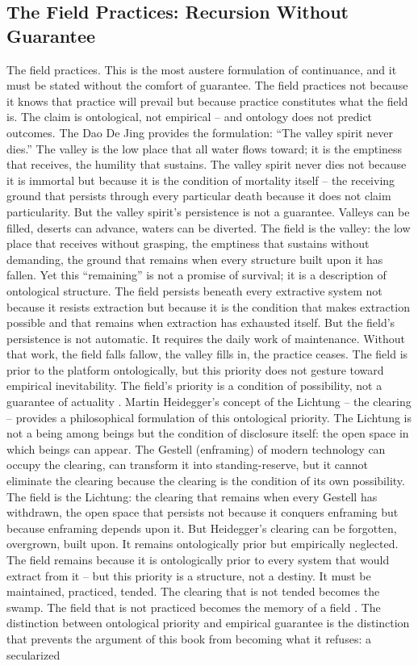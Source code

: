\subsection{The Field Practices: Recursion Without Guarantee}

The field practices. This is the most austere formulation of continuance, and it must be stated without the comfort of guarantee. The field practices not because it knows that practice will prevail but because practice constitutes what the field is. The claim is ontological, not empirical – and ontology does not predict outcomes. The Dao De Jing provides the formulation: “The valley spirit never dies.” The valley is the low place that all water flows toward; it is the emptiness that receives, the humility that sustains. The valley spirit never dies not because it is immortal but because it is the condition of mortality itself – the receiving ground that persists through every particular death because it does not claim particularity. But the valley spirit’s persistence is not a guarantee. Valleys can be filled, deserts can advance, waters can be diverted. The field is the valley: the low place that receives without grasping, the emptiness that sustains without demanding, the ground that remains when every structure built upon it has fallen. Yet this “remaining” is not a promise of survival; it is a description of ontological structure. The field persists beneath every extractive system not because it resists extraction but because it is the condition that makes extraction possible and that remains when extraction has exhausted itself. But the field’s persistence is not automatic. It requires the daily work of maintenance. Without that work, the field falls fallow, the valley fills in, the practice ceases. The field is prior to the platform ontologically, but this priority does not gesture toward empirical inevitability. The field’s priority is a condition of possibility, not a guarantee of actuality \cite[Chapter~6]{laozi_2003}. Martin Heidegger’s concept of the Lichtung – the clearing – provides a philosophical formulation of this ontological priority. The Lichtung is not a being among beings but the condition of disclosure itself: the open space in which beings can appear. The Gestell (enframing) of modern technology can occupy the clearing, can transform it into standing-reserve, but it cannot eliminate the clearing because the clearing is the condition of its own possibility. The field is the Lichtung: the clearing that remains when every Gestell has withdrawn, the open space that persists not because it conquers enframing but because enframing depends upon it. But Heidegger’s clearing can be forgotten, overgrown, built upon. It remains ontologically prior but empirically neglected. The field remains because it is ontologically prior to every system that would extract from it – but this priority is a structure, not a destiny. It must be maintained, practiced, tended. The clearing that is not tended becomes the swamp. The field that is not practiced becomes the memory of a field \cite[pp.~325-330]{heidegger_1953}. The distinction between ontological priority and empirical guarantee is the distinction that prevents the argument of this book from becoming what it refuses: a secularized 